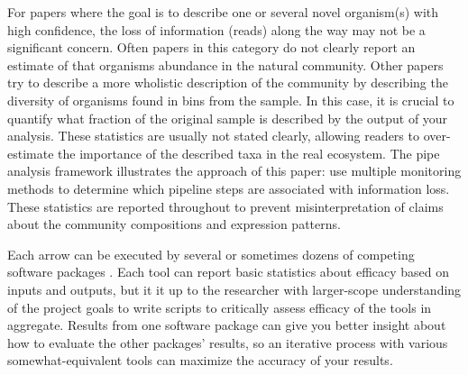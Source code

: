 For papers where the goal is to describe one or several novel organism(s) with high confidence, the loss of information (reads) along the way may not be a significant concern.
Often papers in this category do not clearly report an estimate of that organisms abundance in the natural community.
Other papers try to describe a more wholistic description of the community \cite{kantor2017} by describing the diversity of organisms found in bins from the sample.
In this case, it is crucial to quantify what fraction of the original sample is described by the output of your analysis.
These statistics are usually not stated clearly, allowing readers to over-estimate the importance of the described taxa in the real ecosystem.
The pipe analysis framework illustrates the approach of this paper: use multiple monitoring methods to determine which pipeline steps are associated with information loss.
These statistics are reported throughout to prevent misinterpretation of claims about the community compositions and expression patterns.

Each arrow can be executed by several or sometimes dozens of competing software packages \cite{sangwan2016,thomas2012}.
Each tool can report basic statistics about efficacy based on inputs and outputs, but it it up to the researcher with larger-scope understanding of the project goals to write scripts to critically assess efficacy of the tools in aggregate.
Results from one software package can give you better insight about how to evaluate the other packages' results, so an iterative process with various somewhat-equivalent tools can maximize the accuracy of your results.

